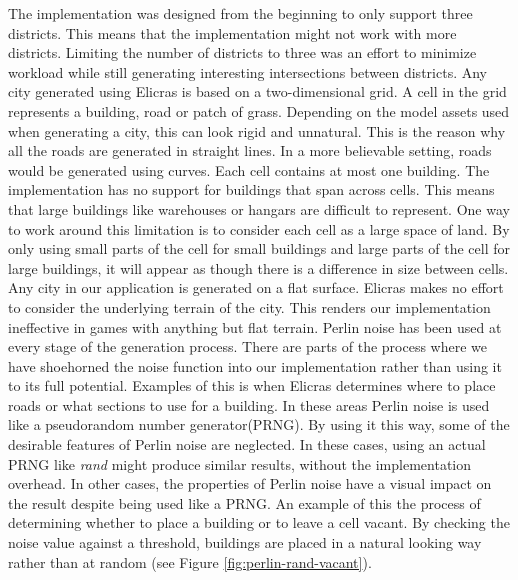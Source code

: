 	The implementation was designed from the beginning to only support three districts. This means that the implementation might not work with more districts. Limiting the number of districts to three was an effort to minimize workload while still generating interesting intersections between districts.
	Any city generated using Elicras is based on a two-dimensional grid. A cell in the grid represents a building, road or patch of grass. Depending on the model assets used when generating a city, this can look rigid and unnatural. This is the reason why all the roads are generated in straight lines. In a more believable setting, roads would be generated using curves. %
	Each cell contains at most one building. The implementation has no support for buildings that span across cells. This means that large buildings like warehouses or hangars are difficult to represent. One way to work around this limitation is to consider each cell as a large space of land. By only using small parts of the cell for small buildings and large parts of the cell for large buildings, it will appear as though there is a difference in size between cells.
	Any city in our application is generated on a flat surface. Elicras makes no effort to consider the underlying terrain of the city. This renders our implementation ineffective in games with anything but flat terrain.
	Perlin noise has been used at every stage of the generation process. There are parts of the process where we have shoehorned the noise function into our implementation rather than using it to its full potential. Examples of this is when Elicras determines where to place roads or what sections to use for a building. In these areas Perlin noise is used like a pseudorandom number generator(PRNG). By using it this way, some of the desirable features of Perlin noise are neglected. In these cases, using an actual PRNG like \textit{rand}\cite{RandCRT} might produce similar results, without the implementation overhead. In other cases, the properties of Perlin noise have a visual impact on the result despite being used like a PRNG. An example of this the process of determining whether to place a building or to leave a cell vacant. By checking the noise value against a threshold, buildings are placed in a natural looking way rather than at random (see Figure \ref{fig:perlin-rand-vacant}).
	
